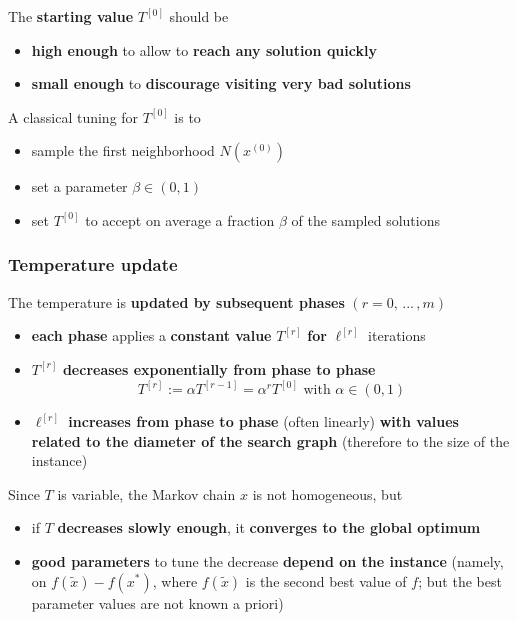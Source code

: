 The \textbf{starting value} $T^{[0]}$ should be
\begin{itemize}
	\item \textbf{high enough} to allow to \textbf{reach any solution quickly}
	\item \textbf{small enough} to \textbf{discourage visiting very bad solutions}
\end{itemize}

A classical tuning for $T^{[0]}$ is to
\begin{itemize}
	\item sample the first neighborhood $N (x^{(0)})$
	\item set a parameter $\beta \in (0, 1)$
	\item set $T^{[0]}$ to accept on average a fraction $\beta$ of the sampled solutions
\end{itemize}

\newpage

\subsubsection{Temperature update}
The temperature is \textbf{updated by subsequent phases} $(r = 0, \, ... \, , m)$
\begin{itemize}
	\item \textbf{each phase} applies a \textbf{constant value} $T^{[r]}$ \textbf{for} $\ell^{[r ]}$ iterations
	
	\item $T^{[r]}$ \textbf{decreases exponentially from phase to phase}
	$$ T^{[r ]} := \alpha T^{[r −1]} = \alpha^r T^{[0]} \text{ with } \alpha \in (0, 1) $$
	
	\item $\ell^{[r ]}$ \textbf{increases from phase to phase} (often linearly) \textbf{with values related to the diameter of the search graph} (therefore to the size of the instance)
\end{itemize}

Since $T$ is variable, the Markov chain $x$ is not homogeneous, but
\begin{itemize}
	\item if $T$ \textbf{decreases slowly enough}, it \textbf{converges to the global optimum}
	
	\item \textbf{good parameters} to tune the decrease \textbf{depend on the instance} (namely, on $f (\tilde{x}) - f (x^\ast)$, where $f (\tilde{x})$ is the second best value of $f$; but the best parameter values are not known a priori)
\end{itemize}


